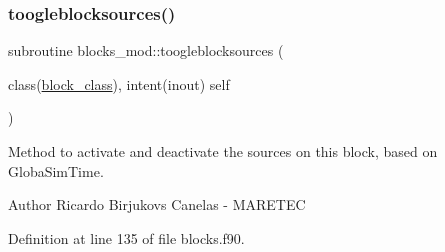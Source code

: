 \mbox{\label{namespaceblocks__mod_ab9e57cbf0103b632b2b2dfa4e4d4139c}} 
\subsubsection{\texorpdfstring{toogleblocksources()}{toogleblocksources()}}
{\footnotesize\ttfamily subroutine blocks\+\_\+mod\+::toogleblocksources (\begin{DoxyParamCaption}\item[{class(\mbox{\hyperlink{structblocks__mod_1_1block__class}{block\+\_\+class}}), intent(inout)}]{self }\end{DoxyParamCaption})\hspace{0.3cm}{\ttfamily [private]}}



Method to activate and deactivate the sources on this block, based on GlobaSim\+Time. 

\begin{DoxyAuthor}{Author}
Ricardo Birjukovs Canelas -\/ M\+A\+R\+E\+T\+EC 
\end{DoxyAuthor}


Definition at line 135 of file blocks.\+f90.


